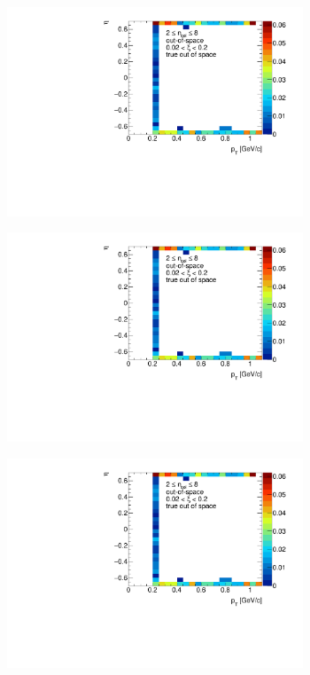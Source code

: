 \begin{figure}[b!]
	\centering
	\begin{subfigure}{.49\textwidth}
		\includegraphics[width=0.97\textwidth,page=1]{chapters/chrgSTAR/img/OKR/outOfSpace.pdf}
	\end{subfigure}
	\begin{subfigure}{.49\textwidth}
		\includegraphics[width=0.97\textwidth,page=2]{chapters/chrgSTAR/img/OKR/outOfSpace.pdf}
	\end{subfigure}
	\begin{subfigure}{.49\textwidth}
		\includegraphics[width=0.97\textwidth,page=3]{chapters/chrgSTAR/img/OKR/outOfSpace.pdf}

\end{subfigure}
\end{figure}
